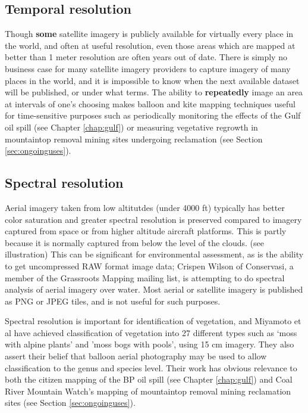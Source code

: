 \documentclass[11pt]{report}
\begin{document}
\subsection{Temporal resolution}

Though \textbf{some} satellite imagery is publicly available for virtually every place in the world, and often at useful resolution, even those areas which are mapped at better than 1 meter resolution are often years out of date. There is simply no business case for many satellite imagery providers to capture imagery of many places in the world, and it is impossible to know when the next available dataset will be published, or under what terms. \cite{oconnor2008maps} The ability to \textbf{repeatedly} image an area at intervals of one's choosing makes balloon and kite mapping techniques useful for time-sensitive purposes such as periodically monitoring the effects of the Gulf oil spill (see Chapter \ref{chap:gulf}) or measuring vegetative regrowth in mountaintop removal mining sites undergoing reclamation (see Section \ref{sec:ongoinguses}). 

\subsection{Spectral resolution}

Aerial imagery taken from low altitutdes (under 4000 ft) typically has better color saturation and greater spectral resolution is preserved compared to imagery captured from space or from higher altitude aircraft platforms. This is partly because it is normally captured from below the level of the clouds. (see illustration) This can be significant for environmental assessment, as is the ability to get uncompressed RAW format image data; Crispen Wilson of Conservasi, a  member of the Grassroots Mapping mailing list, is attempting to do spectral analysis of aerial imagery over water. Most aerial or satellite imagery is published as PNG or JPEG tiles, and is not useful for such purposes.  


Spectral resolution is important for identification of vegetation, and Miyamoto et al have achieved classification of vegetation into 27 different types such as `moss with alpine plants' and 'moss bogs with pools', using 15 cm imagery. They also assert their belief that balloon aerial photography may be used to allow classification to the genus and species level. \cite{miyamoto2004use} Their work has obvious relevance to both the citizen mapping of the BP oil spill (see Chapter \ref{chap:gulf}) and Coal River Mountain Watch's mapping of mountaintop removal mining reclamation sites (see Section \ref{sec:ongoinguses}).
\end{document}
